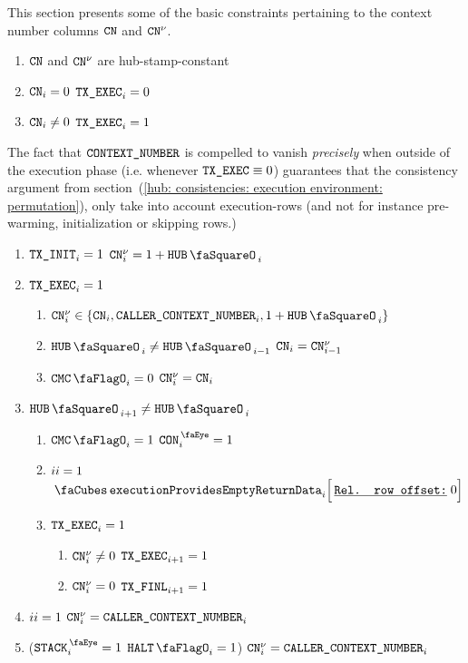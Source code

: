 This section presents some of the basic constraints pertaining to the context number columns $\texttt{CN}$ and $\texttt{CN}^{\nu}$.
\begin{enumerate}
	\item $\texttt{CN}$ and $\texttt{CN}^{\nu}$ are hub-stamp-constant
	\item \If $\texttt{CN} _{i} =    0$ \Then $\texttt{TX}\texttt{\_EXEC}_{i} = 0$
	\item \If $\texttt{CN} _{i} \neq 0$ \Then $\texttt{TX}\texttt{\_EXEC}_{i} = 1$
\end{enumerate}
\saNote{} \label{hub: generalities: context: vanishing of context number outside of the execution phase}
The fact that $\texttt{CONTEXT\_NUMBER}$ is compelled to vanish \emph{precisely} when outside of the execution phase (i.e. whenever $\texttt{TX}\texttt{\_EXEC} \equiv 0$)
guarantees that the consistency argument from section~(\ref{hub: consistencies: execution environment: permutation}),
only take into account execution-rows (and not for instance pre-warming, initialization or skipping rows.)
\begin{enumerate}[resume]
	\item \If $\texttt{TX}\texttt{\_INIT}_{i} = 1$ \Then $\cn\new _{i} = 1 + \hubStamp_{i}$
	\item \If $\texttt{TX}\texttt{\_EXEC}_{i} = 1$ \Then 
		\begin{enumerate}
			\item\label{next context number}
				$\cn\new_{i} \in \{ \cn_{i}, \caller_{i}, 1 + \hubStamp_{i} \}$
			\item \If $\hubStamp_{i} \neq \hubStamp_{i - 1}$ \Then $\texttt{CN}_{i} = \texttt{CN}^{\nu}_{i - 1}$
			\item \If $\cmc_{i} = 0$ \Then $\texttt{CN}^{\nu}_{i} = \texttt{CN}_{i}$
		\end{enumerate}
	\item \If $\hubStamp_{i + 1} \neq \hubStamp_{i}$ \Then
		\begin{enumerate}
			\item \label{hub: generalities: context: whenever the context may change the final row is a context row}
				\If $\cmc_{i}    = 1$ \Then $\peekContext_{i} = 1$
			\item \label{hub: generalities: context: exceptions lead to providing empty return data}
				\If $\xAhoy_{i}  = 1$ \Then $\executionProvidesEmptyReturnData {i}{0} $
			\item \label{hub: generalities: context: how to trigger finalization phase} \If $\texttt{TX}\texttt{\_EXEC}_{i} = 1$
				\begin{enumerate}
				        \item \If $\texttt{CN}^{\nu}_{i} \neq 0$ \Then $\texttt{TX}\texttt{\_EXEC}_{i + 1} = 1$
				        \item \If $\texttt{CN}^{\nu}_{i} =    0$ \Then $\texttt{TX}\texttt{\_FINL}_{i + 1} = 1$
				\end{enumerate}
		\end{enumerate}
	\item \If $\xAhoy_{i} = 1$ \Then $\texttt{CN}^{\nu}_{i} = \texttt{CALLER\_CONTEXT\_NUMBER}_{i}$
	\item \If \big($\peekStack_{i} = 1$ \et $\haltFlag_{i} = 1$\big) \Then $\texttt{CN}^{\nu}_{i} = \texttt{CALLER\_CONTEXT\_NUMBER}_{i}$
\end{enumerate}

